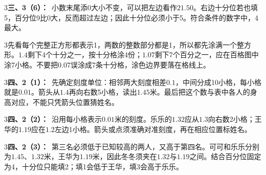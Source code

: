 \documentclass[multi=snippet,border={5bp 20bp 5bp 5bp}]{standalone}
\newenvironment{snippet}[3]{\begin{minipage}{#1bp}\color{answerred}\fontsize{#2}{#3}\selectfont\raggedright}{\end{minipage}}
\begin{document}
\begin{snippet}{505}{11.5}{14}\begin{multicols}{3}\raggedcolumns \textbf{三、3（6）：}\ 小数末尾添0大小不变，可以把左边看作\(21.50\)\allowbreak 。右边十分位若也填5，百分位9比0大，反而超过左边；因此十分位必须小于5。符合条件的数字中，4最大。\end{multicols}\end{snippet}
\begin{snippet}{505}{11.5}{14}\begin{multicols}{3}\raggedcolumns 先看每个完整正方形都表示1，两数的整数部分都是1，所以都先涂满一个整方形。\(1.4\)\allowbreak 剩下4个十分之一，按十分格涂4份；\(1.07\)\allowbreak 剩下7个百分之一，应在百格图中涂7小格。不要把\(0.07\)\allowbreak 误涂成7条十分格，涂色边界要落在格线上。\end{multicols}\end{snippet}
\begin{snippet}{505}{11.5}{14}\begin{multicols}{3}\raggedcolumns \textbf{四、2（1）：}\ 先确定刻度单位：相邻两大刻度相差\(0.1\)\allowbreak ，中间分成10小格，每小格就是\(0.01\)\allowbreak 。箭头从\(1.4\)\allowbreak 再向右数5小格，读出\(1.45\)\allowbreak 米。最后把这个数与表中各人的身高对应，不能只凭箭头位置猜姓名。\end{multicols}\end{snippet}
\begin{snippet}{505}{11.5}{14}\begin{multicols}{3}\raggedcolumns \textbf{四、2（2）：}\ 沿用每小格表示\(0.01\)\allowbreak 米的刻度。乐乐的\(1.32\)\allowbreak 应从\(1.3\)\allowbreak 向右数2小格；王华的\(1.19\)\allowbreak 应在\(1.2\)\allowbreak 左边1小格。箭头或点须准确对准刻度，再在相应位置标姓名。\end{multicols}\end{snippet}
\begin{snippet}{505}{11.5}{14}\begin{multicols}{3}\raggedcolumns \textbf{四、2（3）：}\ 第三名必须低于已知较高的两人，又高于第四名。可可和乐乐分别为\(1.45\)\allowbreak 、\(1.32\)\allowbreak 米，王华为\(1.19\)\allowbreak 米，因此冬冬须夹在\(1.32\)\allowbreak 与\(1.19\)\allowbreak 之间。结合百分位固定为4，十分位只能填2；填1会低于王华，填3会高于乐乐。\end{multicols}\end{snippet}
\end{document}
